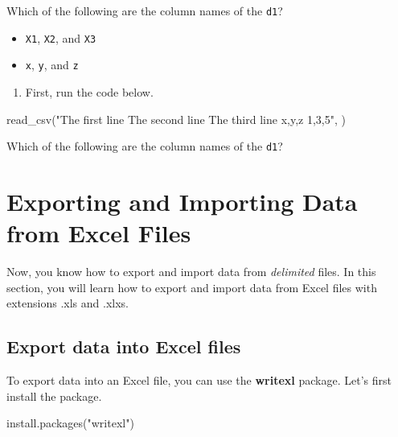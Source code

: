 \documentclass[
]{book}
\newenvironment{Shaded}{\begin{snugshade}}{\end{snugshade}}
\newcommand{\FunctionTok}[1]{\textcolor[rgb]{0.00,0.00,0.00}{#1}}
\newcommand{\NormalTok}[1]{#1}
\newcommand{\StringTok}[1]{\textcolor[rgb]{0.31,0.60,0.02}{#1}}
\providecommand{\tightlist}{%
  \setlength{\itemsep}{0pt}\setlength{\parskip}{0pt}}
\begin{document}
Which of the following are the column names of the \texttt{d1}?

\begin{itemize}
\tightlist
\item
  \texttt{X1}, \texttt{X2}, and \texttt{X3}
\item
  \texttt{x}, \texttt{y}, and \texttt{z}
\end{itemize}

\begin{enumerate}
\def\labelenumi{\arabic{enumi}.}
\setcounter{enumi}{2}
\tightlist
\item
  First, run the code below.
\end{enumerate}

\begin{Shaded}
\begin{Highlighting}[]
\FunctionTok{read\_csv}\NormalTok{(}\StringTok{"The first line }
\StringTok{          The second line}
\StringTok{          The third line}
\StringTok{          x,y,z}
\StringTok{          1,3,5"}\NormalTok{, )}
\end{Highlighting}
\end{Shaded}

Which of the following are the column names of the \texttt{d1}?

\hypertarget{import-excel}{%
\section{Exporting and Importing Data from Excel Files}\label{import-excel}}

Now, you know how to export and import data from \emph{delimited} files. In this section, you will learn how to export and import data from Excel files with extensions .xls and .xlxs.

\hypertarget{export-data-into-excel-files}{%
\subsection{Export data into Excel files}\label{export-data-into-excel-files}}

To export data into an Excel file, you can use the \textbf{writexl} package. Let's first install the package.

\begin{Shaded}
\begin{Highlighting}[]
\FunctionTok{install.packages}\NormalTok{(}\StringTok{"writexl"}\NormalTok{)}
\end{Highlighting}
\end{Shaded}
\end{document}
